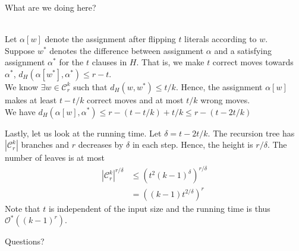 \documentclass[pdf] {beamer}
\newcommand{\dist}[2]{d_H(#1,#2)}
\newcommand{\astar}{\alpha^*}
\newcommand{\cc}{\mathcal{C}}
\renewcommand{\O}{\mathcal{O}^*}
\begin{document}
	\begin{frame}
		What are we doing here?\\~\
		
		Let $\alpha[w]$ denote the assignment after flipping $t$ literals according to $w$. \\
		Suppose $w^*$ denotes the difference between assignment $\alpha$ and a satisfying assignment $\astar$ for the $t$ clauses in $H$. That is, we make $t$ correct moves towards $\astar$, $\dist{\alpha[w^*]}{\astar} \leq r - t$. \\
		We know $\exists w \in \cc_r^k$ such that $\dist{w}{w^*} \leq t/k$. Hence, the assignment $\alpha[w]$ makes at least $t - t/k$ correct moves and at most $t/k$ wrong moves.\\
		 We have $\dist{\alpha[w]}{\astar} \leq r - (t - t/k) + t/k \leq r - (t-2t/k)$
	\end{frame}
	\begin{frame}
		Lastly, let us look at the running time. Let $\delta = t - 2t/k$. The recursion tree has $|\cc_r^k|$ branches and $r$ decreases by $\delta$ in each step. Hence, the height is ${r/\delta}$. The number of leaves is at most
		\begin{align*}
		|\mathcal{C}_r^k|^{r/\delta} &\leq (t^{2}(k-1)^{\delta})^{r/\delta}\\
		&= ((k-1)t^{2/\delta})^{r}
		\end{align*}
		Note that $t$ is independent of the input size and the running time is thus $\O((k-1)^r)$.
	\end{frame}
	\begin{frame}
	Questions?
\end{frame}
\end{document}
